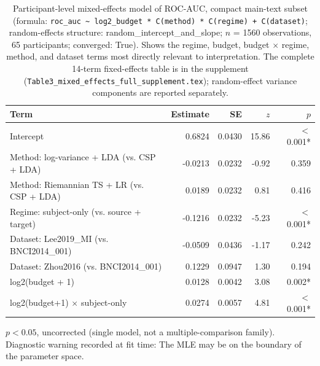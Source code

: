 \begin{table}[t]
\centering
\small
\begin{threeparttable}
\caption{Participant-level mixed-effects model of ROC-AUC, compact main-text subset (formula: \texttt{roc\_auc \textasciitilde{} log2\_budget * C(method) * C(regime) + C(dataset)}; random-effects structure: random\_intercept\_and\_slope; $n$ = 1560 observations, 65 participants; converged: True). Shows the regime, budget, budget $\times$ regime, method, and dataset terms most directly relevant to interpretation. The complete 14-term fixed-effects table is in the supplement (\texttt{Table3\_mixed\_effects\_full\_supplement.tex}); random-effect variance components are reported separately.}
\label{tab:mixed_effects}
\begin{tabular}{lrrrr}
\toprule
Term & Estimate & SE & $z$ & $p$ \\
\midrule
Intercept & 0.6824 & 0.0430 & 15.86 & $<$0.001* \\
Method: log-variance + LDA (vs. CSP + LDA) & -0.0213 & 0.0232 & -0.92 & 0.359 \\
Method: Riemannian TS + LR (vs. CSP + LDA) & 0.0189 & 0.0232 & 0.81 & 0.416 \\
Regime: subject-only (vs. source + target) & -0.1216 & 0.0232 & -5.23 & $<$0.001* \\
Dataset: Lee2019\_MI (vs. BNCI2014\_001) & -0.0509 & 0.0436 & -1.17 & 0.242 \\
Dataset: Zhou2016 (vs. BNCI2014\_001) & 0.1229 & 0.0947 & 1.30 & 0.194 \\
log2(budget + 1) & 0.0128 & 0.0042 & 3.08 & 0.002* \\
log2(budget+1) $\times$ subject-only & 0.0274 & 0.0057 & 4.81 & $<$0.001* \\
\bottomrule
\end{tabular}
\begin{tablenotes}
\footnotesize
\item[*] $p < 0.05$, uncorrected (single model, not a multiple-comparison family). Diagnostic warning recorded at fit time: The MLE may be on the boundary of the parameter space.
\end{tablenotes}
\end{threeparttable}
\end{table}
